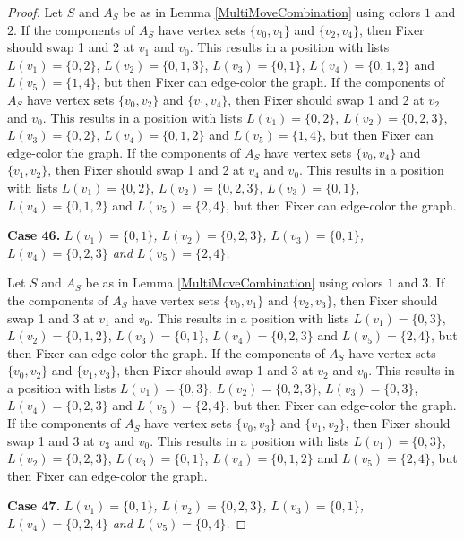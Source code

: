 \documentclass[12pt]{amsart}
\theoremstyle{plain}
\theoremstyle{definition}
\theoremstyle{remark}
\begin{document}
\begin{proof}
Let $S$ and $A_S$ be as in Lemma \ref{MultiMoveCombination} using colors $1$ and $2$. If the components of $A_S$ have vertex sets $\{v_0, v_1\}$ and $\{v_2, v_4\}$, then Fixer should swap 1 and 2 at $v_1$ and $v_0$. This results in a position with lists $L(v_1) = \{0, 2\}$, $L(v_2) = \{0, 1, 3\}$, $L(v_3) = \{0, 1\}$, $L(v_4) = \{0, 1, 2\}$ and $L(v_5) = \{1, 4\}$, but then Fixer can edge-color the graph.
If the components of $A_S$ have vertex sets $\{v_0, v_2\}$ and $\{v_1, v_4\}$, then Fixer should swap 1 and 2 at $v_2$ and $v_0$. This results in a position with lists $L(v_1) = \{0, 2\}$, $L(v_2) = \{0, 2, 3\}$, $L(v_3) = \{0, 2\}$, $L(v_4) = \{0, 1, 2\}$ and $L(v_5) = \{1, 4\}$, but then Fixer can edge-color the graph.
If the components of $A_S$ have vertex sets $\{v_0, v_4\}$ and $\{v_1, v_2\}$, then Fixer should swap 1 and 2 at $v_4$ and $v_0$. This results in a position with lists $L(v_1) = \{0, 2\}$, $L(v_2) = \{0, 2, 3\}$, $L(v_3) = \{0, 1\}$, $L(v_4) = \{0, 1, 2\}$ and $L(v_5) = \{2, 4\}$, but then Fixer can edge-color the graph.

\noindent\textbf{Case 46.  }\textit{$L(v_1) = \{0, 1\}$, $L(v_2) = \{0, 2, 3\}$, $L(v_3) = \{0, 1\}$, $L(v_4) = \{0, 2, 3\}$ and $L(v_5) = \{2, 4\}$.}

Let $S$ and $A_S$ be as in Lemma \ref{MultiMoveCombination} using colors $1$ and $3$. If the components of $A_S$ have vertex sets $\{v_0, v_1\}$ and $\{v_2, v_3\}$, then Fixer should swap 1 and 3 at $v_1$ and $v_0$. This results in a position with lists $L(v_1) = \{0, 3\}$, $L(v_2) = \{0, 1, 2\}$, $L(v_3) = \{0, 1\}$, $L(v_4) = \{0, 2, 3\}$ and $L(v_5) = \{2, 4\}$, but then Fixer can edge-color the graph.
If the components of $A_S$ have vertex sets $\{v_0, v_2\}$ and $\{v_1, v_3\}$, then Fixer should swap 1 and 3 at $v_2$ and $v_0$. This results in a position with lists $L(v_1) = \{0, 3\}$, $L(v_2) = \{0, 2, 3\}$, $L(v_3) = \{0, 3\}$, $L(v_4) = \{0, 2, 3\}$ and $L(v_5) = \{2, 4\}$, but then Fixer can edge-color the graph.
If the components of $A_S$ have vertex sets $\{v_0, v_3\}$ and $\{v_1, v_2\}$, then Fixer should swap 1 and 3 at $v_3$ and $v_0$. This results in a position with lists $L(v_1) = \{0, 3\}$, $L(v_2) = \{0, 2, 3\}$, $L(v_3) = \{0, 1\}$, $L(v_4) = \{0, 1, 2\}$ and $L(v_5) = \{2, 4\}$, but then Fixer can edge-color the graph.

\noindent\textbf{Case 47.  }\textit{$L(v_1) = \{0, 1\}$, $L(v_2) = \{0, 2, 3\}$, $L(v_3) = \{0, 1\}$, $L(v_4) = \{0, 2, 4\}$ and $L(v_5) = \{0, 4\}$.}


\end{proof}
\end{document}
